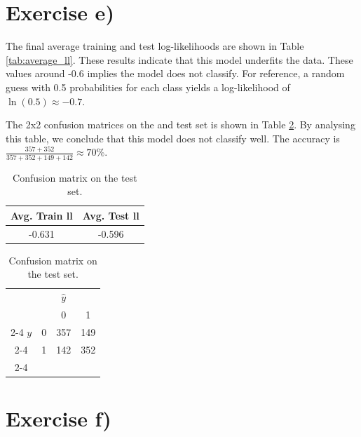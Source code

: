 \documentclass[english]{article}
\providecommand{\tabularnewline}{\\}
\begin{document}
\section{Exercise e)}

The final average training and test log-likelihoods are shown in Table
\ref{tab:average_ll}. These results indicate that this model
underfits the data. These values around -0.6 implies the model
does not classify. For reference, a random guess with 0.5 probabilities for each 
class yields a log-likelihood of $\ln(0.5) \approx -0.7$.



The 2x2 confusion
matrices on the and test set is shown in Table \ref{tab:confusion_test}.
By analysing this table, we conclude that this model does not
classify well. The accuracy is $\frac{357+352}{357+352+149+142} \approx 70\%$.

\begin{table}
\centering{}%
\begin{minipage}[t]{0.49\columnwidth}%
\begin{center}
\begin{tabular}{c|c}
\textbf{Avg. Train ll} & \textbf{Avg. Test ll}\tabularnewline
\hline 
-0.631 & -0.596\tabularnewline
\hline 
\end{tabular} 
\par\end{center}
\caption{Average training and test log-likelihoods.\label{tab:average_ll}}
%
\end{minipage}%
\begin{minipage}[t]{0.49\columnwidth}%
\begin{center}
\begin{tabular}{cc|c|c}
 & \multicolumn{1}{c}{} & \multicolumn{1}{c}{$\hat{y}$} & \tabularnewline
 &  & 0 & 1\tabularnewline
\cline{2-4} 
$y$ & 0 & 357 & 149\tabularnewline
\cline{2-4} 
 & 1 & 142 & 352\tabularnewline
\cline{2-4} 
\end{tabular} 
\par\end{center}
\caption{Confusion matrix on the test set.\label{tab:confusion_test}}
%
\end{minipage}
\end{table}


\section{Exercise f)}
\end{document}
